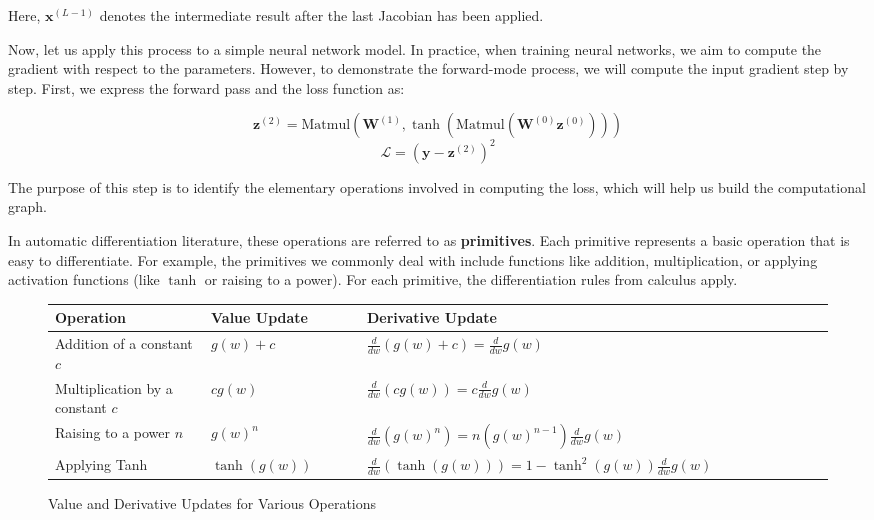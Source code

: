 Here, \( \bm{x}^{(L-1)} \) denotes the intermediate result after the last Jacobian has been applied.

Now, let us apply this process to a simple neural network model. In practice, when training neural networks, we aim to compute the gradient with respect to the parameters. However, to demonstrate the forward-mode process, we will compute the input gradient step by step. First, we express the forward pass and the loss function as:

\begin{equation}
    \bm{z}^{(2)} = \text{Matmul}\left( \bm{W}^{(1)}, \tanh\left( \text{Matmul} \left( \bm{W}^{(0)} \bm{z}^{(0)} \right) \right) \right)
\end{equation}
\begin{equation}
    \mathcal{L} = \left( \bm{y} - \bm{z}^{(2)} \right)^2
\end{equation}

The purpose of this step is to identify the elementary operations involved in computing the loss, which will help us build the computational graph.

In automatic differentiation literature, these operations are referred to as \textbf{primitives}. Each primitive represents a basic operation that is easy to differentiate. For example, the primitives we commonly deal with include functions like addition, multiplication, or applying activation functions (like \( \tanh \) or raising to a power). For each primitive, the differentiation rules from calculus apply.


\begin{figure}[ht]
    \centering
    \begin{tabularx}{\linewidth}{p{0.2\linewidth} p{0.2\linewidth} p{0.6\linewidth}}
        \toprule
        \textbf{Operation}               & \textbf{Value Update} & \textbf{Derivative Update}                                       \\
        \midrule
        Addition of a constant $c$       & $g(w) + c$            & $\frac{d}{dw}(g(w) + c) = \frac{d}{dw}g(w)$                      \\
        \hline
        Multiplication by a constant $c$ & $cg(w)$               & $\frac{d}{dw}(cg(w)) = c \frac{d}{dw}g(w)$                       \\
        \hline
        Raising to a power $n$           & $g(w)^n$              & $\frac{d}{dw}(g(w)^n) = n(g(w)^{n-1})\frac{d}{dw}g(w)$           \\
        \hline
        Applying Tanh                    & $\tanh(g(w))$         & $\frac{d}{dw}(\tanh(g(w))) = 1 - \tanh^2(g(w)) \frac{d}{dw}g(w)$ \\
        \bottomrule
    \end{tabularx}
    \caption{Value and Derivative Updates for Various Operations}
\end{figure}

